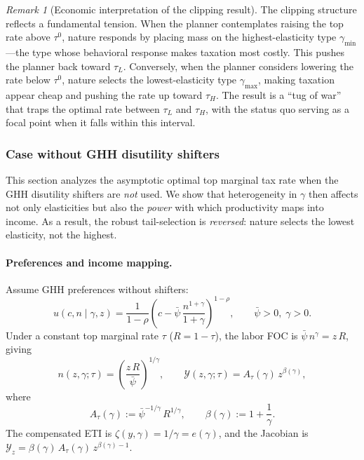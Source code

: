 \documentclass[12pt,a4paper]{article}
\theoremstyle{definition}
\theoremstyle{plain}
\theoremstyle{remark}
\newtheorem{remark}{Remark}[section]
\newcommand{\calY}{\mathcal{Y}}
\begin{document}
\begin{remark}[Economic interpretation of the clipping result]
\label{rem:clipping_econ_2D}
The clipping structure reflects a fundamental tension.  When the planner contemplates raising the top rate above $\tau^0$, nature responds by placing mass on the highest-elasticity type $\gamma_{\min}$---the type whose behavioral response makes taxation most costly.  This pushes the planner back toward $\tau_L$.  Conversely, when the planner considers lowering the rate below $\tau^0$, nature selects the lowest-elasticity type $\gamma_{\max}$, making taxation appear cheap and pushing the rate up toward $\tau_H$.  The result is a ``tug of war'' that traps the optimal rate between $\tau_L$ and $\tau_H$, with the status quo serving as a focal point when it falls within this interval.
\end{remark}


\subsubsection{Case without GHH disutility shifters}
\label{sec:2D_no_shifters}

This section analyzes the asymptotic optimal top marginal tax rate when the GHH disutility shifters are \emph{not} used.  We show that heterogeneity in $\gamma$ then affects not only elasticities but also the \emph{power} with which productivity maps into income.  As a result, the robust tail-selection is \emph{reversed}: nature selects the lowest elasticity, not the highest.

\paragraph{Preferences and income mapping.}

Assume GHH preferences without shifters:
\[
  u(c,n \mid \gamma,z) = \frac{1}{1-\rho}\left(c - \bar\psi\,\frac{n^{1+\gamma}}{1+\gamma}\right)^{1-\rho}, \qquad \bar\psi > 0,\;\gamma > 0.
\]
Under a constant top marginal rate $\tau$ ($R = 1-\tau$), the labor FOC is $\bar\psi\,n^{\gamma} = z\,R$, giving
\begin{equation}
\label{eq:Y_no_shifter_2D}
  n(z,\gamma;\tau) = \left(\frac{z\,R}{\bar\psi}\right)^{1/\gamma}, \qquad
  \calY(z,\gamma;\tau) = A_{\tau}(\gamma)\,z^{\beta(\gamma)},
\end{equation}
where
\[
  A_{\tau}(\gamma) := \bar\psi^{-1/\gamma}\,R^{1/\gamma}, \qquad \beta(\gamma) := 1 + \frac{1}{\gamma}.
\]
The compensated ETI is $\zeta(y,\gamma) = 1/\gamma = e(\gamma)$, and the Jacobian is $\calY_z = \beta(\gamma)\,A_{\tau}(\gamma)\,z^{\beta(\gamma)-1}$.
\end{document}
